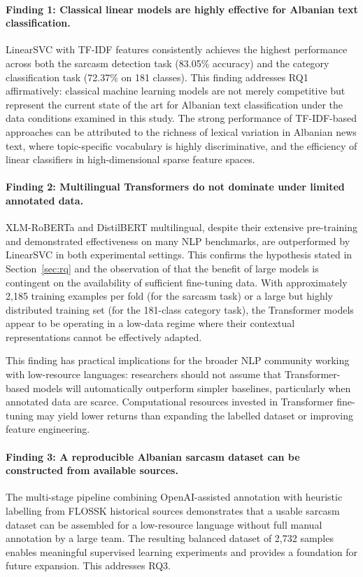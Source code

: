 \documentclass[12pt,a4paper]{article}
\begin{document}
\paragraph{Finding 1: Classical linear models are highly effective for Albanian text classification.}
LinearSVC with TF-IDF features consistently achieves the highest performance across both the sarcasm detection task (83.05\% accuracy) and the category classification task (72.37\% on 181 classes). This finding addresses RQ1 affirmatively: classical machine learning models are not merely competitive but represent the current state of the art for Albanian text classification under the data conditions examined in this study. The strong performance of TF-IDF-based approaches can be attributed to the richness of lexical variation in Albanian news text, where topic-specific vocabulary is highly discriminative, and the efficiency of linear classifiers in high-dimensional sparse feature spaces.

\paragraph{Finding 2: Multilingual Transformers do not dominate under limited annotated data.}
XLM-RoBERTa and DistilBERT multilingual, despite their extensive pre-training and demonstrated effectiveness on many NLP benchmarks, are outperformed by LinearSVC in both experimental settings. This confirms the hypothesis stated in Section~\ref{sec:rq} and the observation of \citet{hedderich2021survey} that the benefit of large models is contingent on the availability of sufficient fine-tuning data. With approximately 2,185 training examples per fold (for the sarcasm task) or a large but highly distributed training set (for the 181-class category task), the Transformer models appear to be operating in a low-data regime where their contextual representations cannot be effectively adapted.

This finding has practical implications for the broader NLP community working with low-resource languages: researchers should not assume that Transformer-based models will automatically outperform simpler baselines, particularly when annotated data are scarce. Computational resources invested in Transformer fine-tuning may yield lower returns than expanding the labelled dataset or improving feature engineering.

\paragraph{Finding 3: A reproducible Albanian sarcasm dataset can be constructed from available sources.}
The multi-stage pipeline combining OpenAI-assisted annotation with heuristic labelling from FLOSSK historical sources demonstrates that a usable sarcasm dataset can be assembled for a low-resource language without full manual annotation by a large team. The resulting balanced dataset of 2,732 samples enables meaningful supervised learning experiments and provides a foundation for future expansion. This addresses RQ3.
\end{document}
